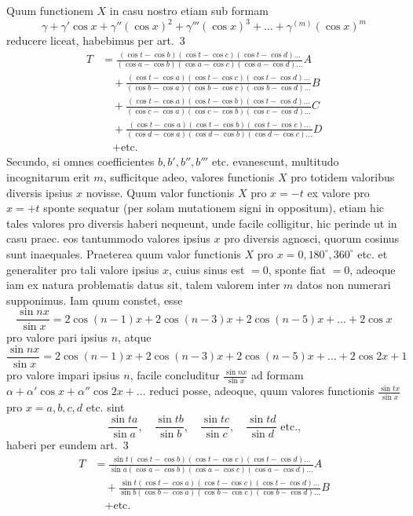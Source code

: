 \documentclass[12pt,a4paper]{article}
\theoremstyle{plain}
\begin{document}
Quum functionem $X$ in casu nostro etiam sub formam
\[
\gamma + \gamma'\cos x + \gamma''(\cos x)^2 + \gamma'''(\cos x)^3 + \ldots + \gamma^{(m)}(\cos x)^m
\]
reducere liceat, habebimus per art.\ 3
\begin{align*} T &= \frac{(\cos t - \cos b)(\cos t - \cos c)(\cos t - \cos d)\ldots}{(
\cos a - \cos b)(\cos a - \cos c)(\cos a - \cos d)\ldots}A \\
&\quad + \frac{(\cos t - \cos a)(\cos t - \cos c)(\cos t - \cos d)\ldots}{(
\cos b - \cos a)(\cos b - \cos c)(\cos b - \cos d)\ldots}B \\
&\quad + \frac{(\cos t - \cos a)(\cos t - \cos b)(\cos t - \cos d)\ldots}{(
\cos c - \cos a)(\cos c - \cos b)(\cos c - \cos d)\ldots}C \\
&\quad + \frac{(\cos t - \cos a)(\cos t - \cos b)(\cos t - \cos c)\ldots}{(
\cos d - \cos a)(\cos d - \cos b)(\cos d - \cos c)\ldots}D \\
&\quad + \text{etc.}
\end{align*}
Secundo, si omnes coefficientes $b, b', b'', b'''$ etc. evanescunt, multitudo incognitarum erit $m$, sufficitque adeo, valores functionis $X$ pro totidem valoribus
diversis ipsius $x$ novisse. Quum valor functionis $X$ pro $x = -t$ ex valore pro
$x = +t$ sponte sequatur (per solam mutationem signi in oppositum), etiam hic tales valores pro diversis haberi nequeunt, unde facile colligitur, hic perinde ut in casu
praec. eos tantummodo valores ipsius $x$ pro diversis agnosci, quorum cosinus sunt inaequales. Praeterea quum valor functionis $X$ pro $x = 0, 180^{\circ}, 360^{\circ}$ etc. et
generaliter pro tali valore ipsius $x$, cuius sinus est $=0$, sponte fiat $=0$, adeoque iam ex natura problematis datus sit, talem valorem inter $m$ datos non numerari
supponimus. Iam quum constet, esse
\[
\frac{\sin nx}{\sin x} = 2\cos(n-1)x + 2\cos(n-3)x + 2\cos(n-5)x + \ldots + 2\cos x
\]
pro valore pari ipsius $n$, atque
\[
\frac{\sin nx}{\sin x} = 2\cos(n-1)x + 2\cos(n-3)x + 2\cos(n-5)x + \ldots + 2\cos 2x + 1
\]
pro valore impari ipsius $n$, facile concluditur $\frac{\sin nx}{\sin x}$ ad formam
$\alpha + \alpha'\cos x + \alpha''\cos 2x + \ldots$ reduci posse, adeoque, quum valores functionis
$\frac{\sin tx}{\sin x}$ pro $x = a, b, c, d$ etc. sint
\[
\frac{\sin ta}{\sin a},\quad \frac{\sin tb}{\sin b},\quad \frac{\sin tc}{\sin c},\quad \frac{\sin td}{\sin d}\text{ etc.,}
\]
haberi per eundem art.\ 3
\begin{align*} T &= \frac{\sin t(\cos t - \cos b)(\cos t - \cos c)(\cos t - \cos d)\ldots}{\sin a(\cos a - \cos b)(\cos a - \cos c)(\cos a - \cos d)\ldots}A \\
&\quad + \frac{\sin t(\cos t - \cos a)(\cos t - \cos c)(\cos t - \cos d)\ldots}{\sin b(\cos b - \cos a)(\cos b - \cos c)(\cos b - \cos d)\ldots}B \\
&\quad + \text{etc.}
\end{align*}
\end{document}
